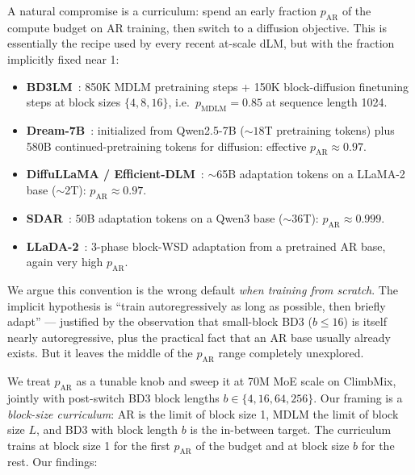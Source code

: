 \documentclass{article}
\newcommand{\pAR}{p_{\mathrm{AR}}}
\begin{document}
A natural compromise is a curriculum: spend an early fraction $\pAR$ of the compute budget on AR training, then switch to a diffusion objective. This is essentially the recipe used by every recent at-scale dLM, but with the fraction implicitly fixed near 1:

\begin{itemize}
\item \textbf{BD3LM}~\citep{arriola2025block}: 850K MDLM pretraining steps + 150K block-diffusion finetuning steps at block sizes $\{4, 8, 16\}$, i.e.\ $p_{\mathrm{MDLM}}{=}0.85$ at sequence length 1024.
\item \textbf{Dream-7B}~\citep{dream2025}: initialized from Qwen2.5-7B (${\sim}18$T pretraining tokens) plus 580B continued-pretraining tokens for diffusion: effective $\pAR \approx 0.97$.
\item \textbf{DiffuLLaMA / Efficient-DLM}~\citep{efficientdlm2025}: $\sim$65B adaptation tokens on a LLaMA-2 base ($\sim$2T): $\pAR \approx 0.97$.
\item \textbf{SDAR}~\citep{sdar2025}: $50$B adaptation tokens on a Qwen3 base ($\sim$36T): $\pAR \approx 0.999$.
\item \textbf{LLaDA-2}~\citep{llada2_2025}: 3-phase block-WSD adaptation from a pretrained AR base, again very high $\pAR$.
\end{itemize}

We argue this convention is the wrong default \emph{when training from scratch}. The implicit hypothesis is ``train autoregressively as long as possible, then briefly adapt'' --- justified by the observation that small-block BD3 ($b{\le}16$) is itself nearly autoregressive, plus the practical fact that an AR base usually already exists. But it leaves the middle of the $\pAR$ range completely unexplored.

We treat $\pAR$ as a tunable knob and sweep it at 70M MoE scale on ClimbMix, jointly with post-switch BD3 block lengths $b \in \{4, 16, 64, 256\}$. Our framing is a \emph{block-size curriculum}: AR is the limit of block size 1, MDLM the limit of block size $L$, and BD3 with block length $b$ is the in-between target. The curriculum trains at block size 1 for the first $\pAR$ of the budget and at block size $b$ for the rest. Our findings:
\end{document}
